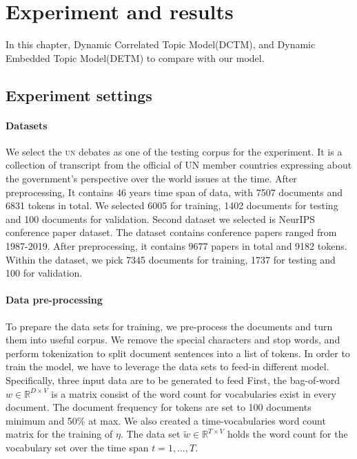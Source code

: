 \section{Experiment and results}
In this chapter, Dynamic Correlated Topic Model(DCTM)\cite{tomasi_stochastic_nodate}, and Dynamic Embedded Topic Model(DETM)\cite{dieng_dynamic_2019} to compare with our model.
\subsection{Experiment settings}
\paragraph{Datasets}
We select the \textsc{un} debates as one of the testing corpus for the experiment. It is a collection of transcript from the official of UN member countries expressing about the  government's perspective over the world issues at the time.
After preprocessing, It contains 46 years time span of data, with 7507 documents and 6831 tokens in total. We selected 6005 for training, 1402 documents for testing and 100 documents for validation.
Second dataset we selected is NeurIPS conference paper dataset. The dataset contains conference papers ranged from 1987-2019. After preprocessing, it contains 9677 papers in total and 9182 tokens. Within the dataset, we pick 7345 documents for training, 1737 for testing and 100 for validation.
\paragraph{Data pre-processing}
To prepare the data sets for training, we pre-process the documents and turn them into useful corpus.
We remove the special characters and stop words, and perform tokenization to split document sentences into a list of tokens. 
In order to train the model, we have to leverage the data sets to feed-in different model. Specifically, three input data are to be generated to feed
First, the bag-of-word $ w\in\mathbb{R}^{D\times V} $ is a matrix consist of the word count for vocabularies exist in every document. The document frequency for tokens are set to 100 documents minimum and 50\% at max.
We also created a time-vocabularies word count matrix for the training of $ \eta $. The data set $ \tilde{w}\in\mathbb{R}^{T\times V} $ holds the word count for the vocabulary set over the time span $ t=1,\dots,T $.
